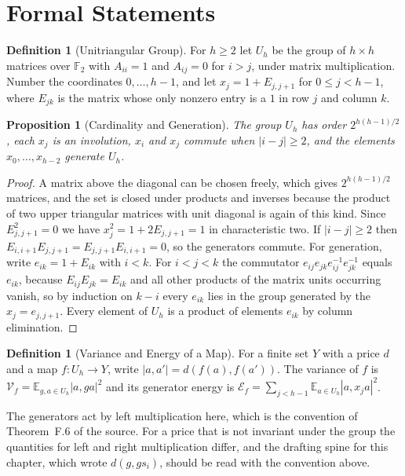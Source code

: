 \documentclass[11pt,letterpaper]{report}
\theoremstyle{plain}
\newtheorem{proposition}[theorem]{Proposition}
\theoremstyle{definition}
\newtheorem{definition}[theorem]{Definition}
\theoremstyle{remark}
\begin{document}
\section{Formal Statements}

\begin{definition}[Unitriangular Group]
For $h\ge2$ let $U_h$ be the group of $h\times h$ matrices over $\mathbb F_2$ with $A_{ii}=1$ and $A_{ij}=0$ for $i>j$, under matrix multiplication. Number the coordinates $0,\ldots,h-1$, and let $x_j=1+E_{j,j+1}$ for $0\le j<h-1$, where $E_{jk}$ is the matrix whose only nonzero entry is a $1$ in row $j$ and column $k$.
\end{definition}

\begin{proposition}[Cardinality and Generation]\label{pr:unitri}
The group $U_h$ has order $2^{h(h-1)/2}$, each $x_j$ is an involution, $x_i$ and $x_j$ commute when $|i-j|\ge2$, and the elements $x_0,\ldots,x_{h-2}$ generate $U_h$.
\end{proposition}
\begin{proof}
A matrix above the diagonal can be chosen freely, which gives $2^{h(h-1)/2}$ matrices, and the set is closed under products and inverses because the product of two upper triangular matrices with unit diagonal is again of this kind. Since $E_{j,j+1}^2=0$ we have $x_j^2=1+2E_{j,j+1}=1$ in characteristic two. If $|i-j|\ge2$ then $E_{i,i+1}E_{j,j+1}=E_{j,j+1}E_{i,i+1}=0$, so the generators commute. For generation, write $e_{ik}=1+E_{ik}$ with $i<k$. For $i<j<k$ the commutator $e_{ij}e_{jk}e_{ij}^{-1}e_{jk}^{-1}$ equals $e_{ik}$, because $E_{ij}E_{jk}=E_{ik}$ and all other products of the matrix units occurring vanish, so by induction on $k-i$ every $e_{ik}$ lies in the group generated by the $x_j=e_{j,j+1}$. Every element of $U_h$ is a product of elements $e_{ik}$ by column elimination.
\end{proof}

\begin{definition}[Variance and Energy of a Map]
For a finite set $Y$ with a price $d$ and a map $f:U_h\to Y$, write $|a,a'|=d(f(a),f(a'))$. The variance of $f$ is $\mathcal V_f=\mathbb E_{g,a\in U_h}|a,ga|^2$ and its generator energy is $\mathcal E_f=\sum_{j<h-1}\mathbb E_{a\in U_h}|a,x_ja|^2$.
\end{definition}

The generators act by left multiplication here, which is the convention of Theorem~F.6 of the source. For a price that is not invariant under the group the quantities for left and right multiplication differ, and the drafting spine for this chapter, which wrote $d(g,gs_i)$, should be read with the convention above.
\end{document}
